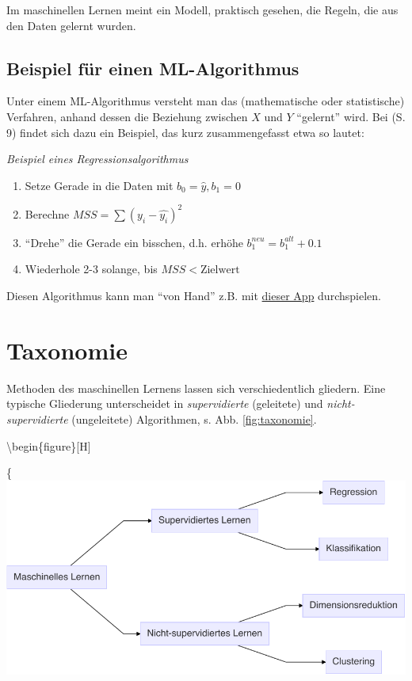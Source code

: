 \documentclass[
]{book}
\providecommand{\tightlist}{%
  \setlength{\itemsep}{0pt}\setlength{\parskip}{0pt}}
\begin{document}
Im maschinellen Lernen meint ein Modell, praktisch gesehen, die Regeln,
die aus den Daten gelernt wurden.

\hypertarget{beispiel-fuxfcr-einen-ml-algorithmus}{%
\subsection{Beispiel für einen ML-Algorithmus}\label{beispiel-fuxfcr-einen-ml-algorithmus}}

Unter einem ML-Algorithmus versteht man das (mathematische oder statistische) Verfahren,
anhand dessen die Beziehung zwischen \(X\) und \(Y\) ``gelernt'' wird. Bei \citet{rhys} (S. 9) findet sich dazu ein Beispiel, das kurz zusammengefasst etwa so lautet:

\emph{Beispiel eines Regressionsalgorithmus}

\begin{enumerate}
\def\labelenumi{\arabic{enumi}.}
\tightlist
\item
  Setze Gerade in die Daten mit \(b_0 = \hat{y}, b_1 = 0\)
\item
  Berechne \(MSS = \sum (y_i - \hat{y_i})^2\)
\item
  ``Drehe'' die Gerade ein bisschen, d.h. erhöhe \(b_1^{neu} = b_1^{alt} + 0.1\)
\item
  Wiederhole 2-3 solange, bis \(MSS < \text{Zielwert}\)
\end{enumerate}

Diesen Algorithmus kann man ``von Hand'' z.B. mit \href{https://shinyapps.org/showapp.php?app=https://shiny.psy.lmu.de/felix/lmfit\&by=Felix\%20Sch\%C3\%B6nbrodt\&title=Find-a-fit!\&shorttitle=Find-a-fit!}{dieser App} durchspielen.

\hypertarget{taxonomie}{%
\section{Taxonomie}\label{taxonomie}}

Methoden des maschinellen Lernens lassen sich verschiedentlich gliedern.
Eine typische Gliederung unterscheidet in \emph{supervidierte} (geleitete) und \emph{nicht-supervidierte} (ungeleitete) Algorithmen, s. Abb. \ref{fig:taxonomie}.

\textbackslash begin\{figure\}{[}H{]}

\{\centering \includegraphics[width=0.7\linewidth]{chunk-img/taxonomie-1}
\end{document}
